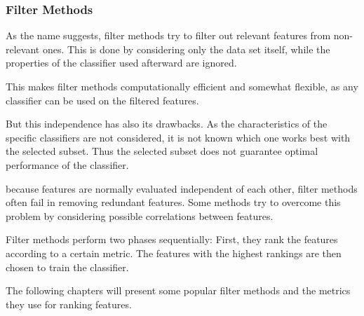\subsubsection{Filter Methods}
\label{sec:methods.flat.filter}


As the name suggests, filter methods try to filter out relevant features from
non-relevant ones. This is done by considering only the data set itself, while
the properties of the classifier used afterward are ignored.
 
This makes filter methods computationally efficient and somewhat flexible, 
as any classifier can be used on the filtered features.  

But this independence has also its drawbacks. As the characteristics of the 
specific classifiers are not considered, it is not known which one works 
best with the selected subset. Thus the selected subset does not guarantee optimal 
performance of the classifier.

because features are normally evaluated independent of each other, filter methods often
fail in removing redundant features. Some methods try to overcome this problem by 
considering possible correlations between features.

Filter methods perform two phases sequentially: First, they rank the features according 
to a certain metric. The features with the highest rankings are then chosen to train the
classifier. 

The following chapters will present some popular filter methods and the metrics they use
for ranking features.



%
